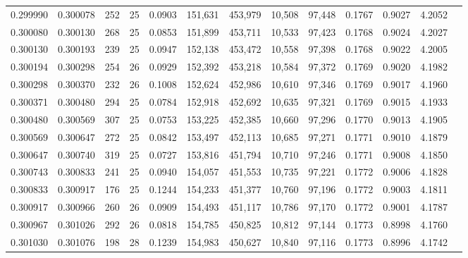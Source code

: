 \begin{tabular}{rrrrrrrrrrrrr}
0.299990 & 0.300078 &   252 &  25 &                                     0.0903 & 151,631 & 453,979 &  10,508 &  97,448 & 0.1767 & 0.9027 & 4.2052 \\
0.300080 & 0.300130 &   268 &  25 &                                     0.0853 & 151,899 & 453,711 &  10,533 &  97,423 & 0.1768 & 0.9024 & 4.2027 \\
0.300130 & 0.300193 &   239 &  25 &                                     0.0947 & 152,138 & 453,472 &  10,558 &  97,398 & 0.1768 & 0.9022 & 4.2005 \\
0.300194 & 0.300298 &   254 &  26 &                                     0.0929 & 152,392 & 453,218 &  10,584 &  97,372 & 0.1769 & 0.9020 & 4.1982 \\
0.300298 & 0.300370 &   232 &  26 &                                     0.1008 & 152,624 & 452,986 &  10,610 &  97,346 & 0.1769 & 0.9017 & 4.1960 \\
0.300371 & 0.300480 &   294 &  25 &                                     0.0784 & 152,918 & 452,692 &  10,635 &  97,321 & 0.1769 & 0.9015 & 4.1933 \\
0.300480 & 0.300569 &   307 &  25 &                                     0.0753 & 153,225 & 452,385 &  10,660 &  97,296 & 0.1770 & 0.9013 & 4.1905 \\
0.300569 & 0.300647 &   272 &  25 &                                     0.0842 & 153,497 & 452,113 &  10,685 &  97,271 & 0.1771 & 0.9010 & 4.1879 \\
0.300647 & 0.300740 &   319 &  25 &                                     0.0727 & 153,816 & 451,794 &  10,710 &  97,246 & 0.1771 & 0.9008 & 4.1850 \\
0.300743 & 0.300833 &   241 &  25 &                                     0.0940 & 154,057 & 451,553 &  10,735 &  97,221 & 0.1772 & 0.9006 & 4.1828 \\
0.300833 & 0.300917 &   176 &  25 &                                     0.1244 & 154,233 & 451,377 &  10,760 &  97,196 & 0.1772 & 0.9003 & 4.1811 \\
0.300917 & 0.300966 &   260 &  26 &                                     0.0909 & 154,493 & 451,117 &  10,786 &  97,170 & 0.1772 & 0.9001 & 4.1787 \\
0.300967 & 0.301026 &   292 &  26 &                                     0.0818 & 154,785 & 450,825 &  10,812 &  97,144 & 0.1773 & 0.8998 & 4.1760 \\
0.301030 & 0.301076 &   198 &  28 &                                     0.1239 & 154,983 & 450,627 &  10,840 &  97,116 & 0.1773 & 0.8996 & 4.1742 \\

\end{tabular}
